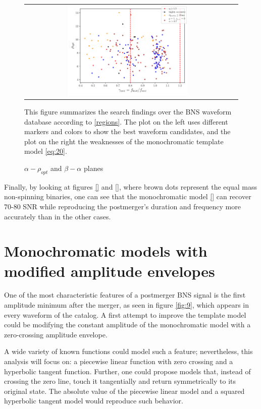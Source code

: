 \begin{figure}[hbt!]
\begin{center}
\begin{tabular}{cc}
\includegraphics[width=0.6\textwidth, angle=0]{images/Data_analysis/results/alpha_sum2.pdf}
\end{tabular}
\end{center}
\caption{$\alpha - \rho_{opt}$ and $\beta - \alpha$  planes}
This figure summarizes the search findings over the BNS waveform database according to \ref{regions}. The plot on the left uses different markers and colors to show the best waveform candidates, and the plot on the right the weaknesses of the monochromatic template model \ref{eq:20}.
\end{figure}

\FloatBarrier

Finally, by looking at figures \ref{} and \ref{}, where brown dots represent the equal mass non-spinning binaries, one can see that the monochromatic model \ref{} can recover 70-80%
SNR while reproducing the postmerger's duration and frequency more accurately than in the other cases.





\newpage
\section{Monochromatic models with modified amplitude envelopes}\label{zc-aenv}
One of the most characteristic features of a postmerger BNS signal is the first amplitude minimum after the merger, as seen in figure \ref{fig:9}, which appears in every waveform of the catalog. A first attempt to improve the template model could be modifying the constant amplitude of the monochromatic model with a zero-crossing amplitude envelope. 

A wide variety of known functions could model such a feature; nevertheless, this analysis will focus on: a piecewise linear function with zero crossing and a hyperbolic tangent function. Further, one could propose models that, instead of crossing the zero line, touch it tangentially and return symmetrically to its original state. The absolute value of the piecewise linear model and a squared hyperbolic tangent model would reproduce such behavior.

